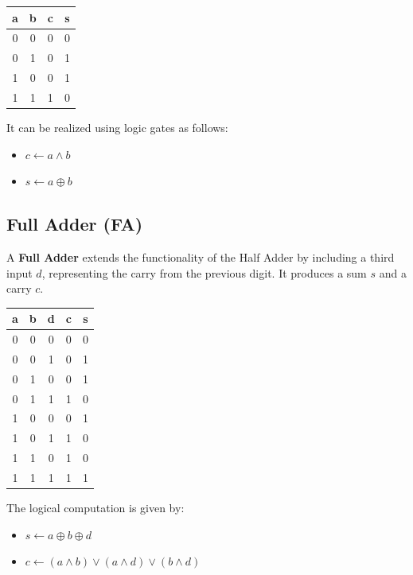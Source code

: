 \documentclass{article}
\begin{document}
\begin{center}
\begin{tabular}{ |c|c|c|c| } 
 \hline
 a & b & c & s  \\ 
 \hline
 0 & 0 & 0 & 0 \\ 
 0 & 1 & 0 & 1 \\ 
 1 & 0 & 0 & 1 \\ 
 1 & 1 & 1 & 0 \\ 
 \hline
\end{tabular}
\end{center}

It can be realized using logic gates as follows:
\begin{itemize}
  \item $c \leftarrow a \land b$
  \item $s \leftarrow a \oplus b$
\end{itemize}

\subsection{Full Adder (FA)}
A \textbf{Full Adder} extends the functionality of the Half Adder by including a third input $d$, representing the carry from the previous digit. It produces a sum $s$ and a carry $c$.

\begin{center}
\begin{tabular}{ |c|c|c|c|c| } 
 \hline
 a & b & d & c & s  \\ 
 \hline
 0 & 0 & 0 & 0 & 0 \\ 
 0 & 0 & 1 & 0 & 1 \\ 
 0 & 1 & 0 & 0 & 1 \\ 
 0 & 1 & 1 & 1 & 0 \\ 
 1 & 0 & 0 & 0 & 1 \\ 
 1 & 0 & 1 & 1 & 0 \\ 
 1 & 1 & 0 & 1 & 0 \\ 
 1 & 1 & 1 & 1 & 1 \\ 
 \hline
\end{tabular}
\end{center}

The logical computation is given by:
\begin{itemize}
  \item $s \leftarrow a \oplus b \oplus d$
  \item $c \leftarrow (a \land b) \lor (a \land d) \lor (b \land d)$
\end{itemize}
\end{document}
